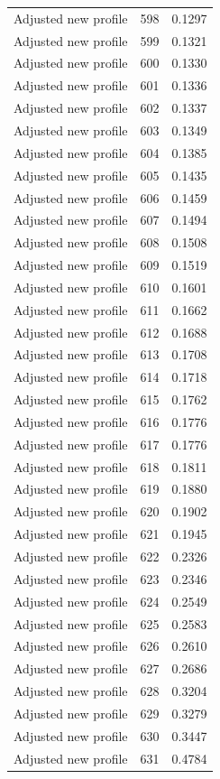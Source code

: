 \begin{table}[htbp]
\begin{tabular}{lll}
Adjusted new profile & 598 & 0.1297 \\
Adjusted new profile & 599 & 0.1321 \\
Adjusted new profile & 600 & 0.1330 \\
Adjusted new profile & 601 & 0.1336 \\
Adjusted new profile & 602 & 0.1337 \\
Adjusted new profile & 603 & 0.1349 \\
Adjusted new profile & 604 & 0.1385 \\
Adjusted new profile & 605 & 0.1435 \\
Adjusted new profile & 606 & 0.1459 \\
Adjusted new profile & 607 & 0.1494 \\
Adjusted new profile & 608 & 0.1508 \\
Adjusted new profile & 609 & 0.1519 \\
Adjusted new profile & 610 & 0.1601 \\
Adjusted new profile & 611 & 0.1662 \\
Adjusted new profile & 612 & 0.1688 \\
Adjusted new profile & 613 & 0.1708 \\
Adjusted new profile & 614 & 0.1718 \\
Adjusted new profile & 615 & 0.1762 \\
Adjusted new profile & 616 & 0.1776 \\
Adjusted new profile & 617 & 0.1776 \\
Adjusted new profile & 618 & 0.1811 \\
Adjusted new profile & 619 & 0.1880 \\
Adjusted new profile & 620 & 0.1902 \\
Adjusted new profile & 621 & 0.1945 \\
Adjusted new profile & 622 & 0.2326 \\
Adjusted new profile & 623 & 0.2346 \\
Adjusted new profile & 624 & 0.2549 \\
Adjusted new profile & 625 & 0.2583 \\
Adjusted new profile & 626 & 0.2610 \\
Adjusted new profile & 627 & 0.2686 \\
Adjusted new profile & 628 & 0.3204 \\
Adjusted new profile & 629 & 0.3279 \\
Adjusted new profile & 630 & 0.3447 \\
Adjusted new profile & 631 & 0.4784 \\
\bottomrule
\end{tabular}
\end{table}
